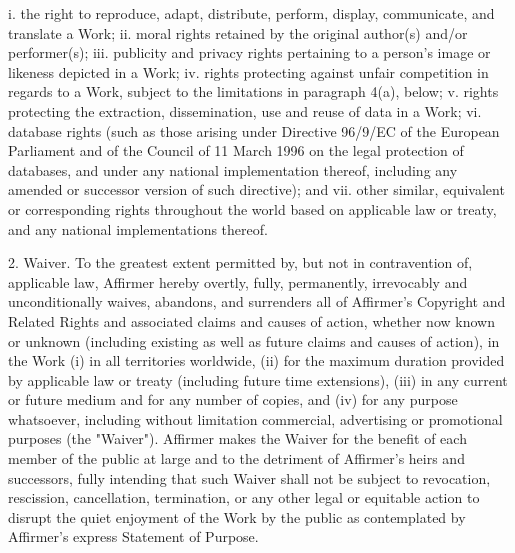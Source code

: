 \documentclass[parskip=half]{scrartcl}
\begin{document}
  i. the right to reproduce, adapt, distribute, perform, display,
     communicate, and translate a Work;
 ii. moral rights retained by the original author(s) and/or performer(s);
iii. publicity and privacy rights pertaining to a person's image or
     likeness depicted in a Work;
 iv. rights protecting against unfair competition in regards to a Work,
     subject to the limitations in paragraph 4(a), below;
  v. rights protecting the extraction, dissemination, use and reuse of data
     in a Work;
 vi. database rights (such as those arising under Directive 96/9/EC of the
     European Parliament and of the Council of 11 March 1996 on the legal
     protection of databases, and under any national implementation
     thereof, including any amended or successor version of such
     directive); and
vii. other similar, equivalent or corresponding rights throughout the
     world based on applicable law or treaty, and any national
     implementations thereof.

2. Waiver. To the greatest extent permitted by, but not in contravention
of, applicable law, Affirmer hereby overtly, fully, permanently,
irrevocably and unconditionally waives, abandons, and surrenders all of
Affirmer's Copyright and Related Rights and associated claims and causes
of action, whether now known or unknown (including existing as well as
future claims and causes of action), in the Work (i) in all territories
worldwide, (ii) for the maximum duration provided by applicable law or
treaty (including future time extensions), (iii) in any current or future
medium and for any number of copies, and (iv) for any purpose whatsoever,
including without limitation commercial, advertising or promotional
purposes (the "Waiver"). Affirmer makes the Waiver for the benefit of each
member of the public at large and to the detriment of Affirmer's heirs and
successors, fully intending that such Waiver shall not be subject to
revocation, rescission, cancellation, termination, or any other legal or
equitable action to disrupt the quiet enjoyment of the Work by the public
as contemplated by Affirmer's express Statement of Purpose.
\end{document}
